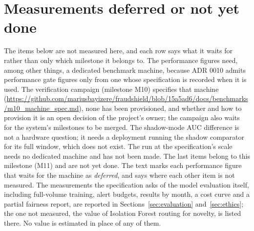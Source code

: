 \section{Measurements deferred or not yet done}
\label{app:deferred}

The items below are not measured here, and each row says what it waits for rather than only which
milestone it belongs to. The performance figures need, among other things, a dedicated benchmark
machine, because ADR 0010 admits performance gate figures only from one whose specification is
recorded when it is used. The verification campaign (milestone M10) specifies that machine
(\url{https://github.com/mariusbayizere/fraudshield/blob/15a5ad6/docs/benchmarks/m10_machine_spec.md}),
none has been provisioned, and whether and how to provision it is an open decision of the project's
owner; the campaign also waits for the system's milestones to be merged. The shadow-mode AUC
difference is not a hardware question; it needs a deployment running the shadow comparator for its
full window, which does not exist. The run at the specification's scale needs no dedicated machine
and has not been made. The last items belong to this milestone (M11) and are not yet done. The text
marks each performance figure that waits for the machine as \emph{deferred}, and says where each
other item is not measured. The measurements
the specification asks of the model evaluation itself, including full-volume training, alert
budgets, results by month, a cost curve and a partial fairness report, are reported in
Sections~\ref{sec:evaluation} and~\ref{sec:ethics}; the one not measured, the value of Isolation
Forest routing for novelty, is listed there. No value is estimated in place of any of them.

